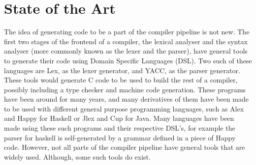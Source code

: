\chapter{State of the Art}

The idea of generating code to be a part of the compiler pipeline is not new.
The first two stages of the frontend of a compiler, the lexical analyser and the syntax analyser (more commonly known as the lexer and the parser), have general tools to generate their code using Domain Specific Languages (DSL)\cite{Bentley:1986:PPL:6424.315691,van2000domain}.
Two such of these languages are Lex, as the lexer generator, and YACC, as the parser generator.
These tools would generate C code to be used to build the rest of a compiler, possibly including a type checker and machine code generation.
These programs have been around for many years, and many derivatives of them have been made to be used with different general purpose programming languages, such as Alex and Happy for Haskell or Jlex and Cup for Java\cite{ranta2012implementing}.
Many languages have been made using these such programs and their respective DSL's, for example the parser for haskell is self-generated by a grammar defined in a piece of Happy code.
However, not all parts of the compiler pipeline have general tools that are widely used.
Although, some such tools do exist\cite{grimm2007typical,ruler:10.1007/11737414_4}.
